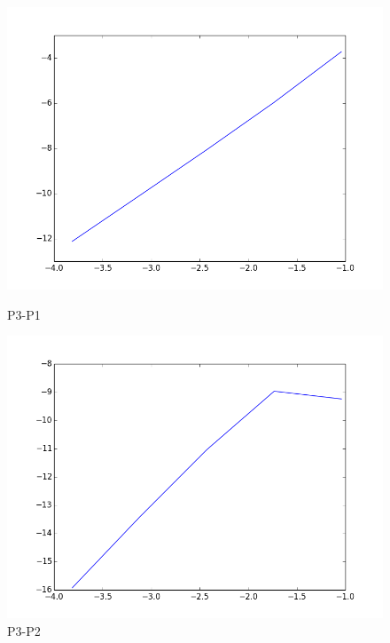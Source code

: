 \documentclass[a4paper,norsk]{article}
\begin{document}
\begin{figure}[h] 
  \label{ fig7} 
  \begin{minipage}[b]{0.6\linewidth}
    \centering
    \includegraphics[scale=0.3]{wall_shear_log_plot_p3_p1.png}   
    \caption{P3-P1} 
    \vspace{4ex}
  \end{minipage}%
  \begin{minipage}[b]{0.6\linewidth}
    \centering
   \includegraphics[scale=0.3]{wall_shear_log_plot_p3_p2.png}    
    \caption{P3-P2} 
    \vspace{4ex}
  \end{minipage} 
  \begin{minipage}[b]{0.6\linewidth}

\end{minipage}
\end{figure}
\end{document}
